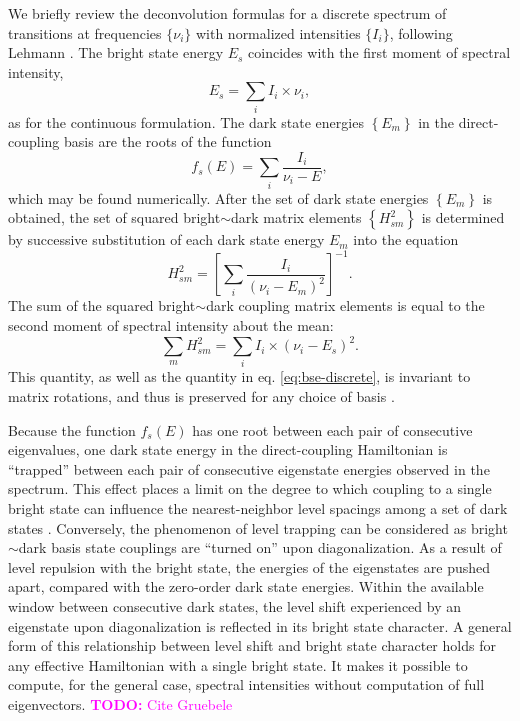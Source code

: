 \documentclass[12pt]{mitthesis}
\newcommand{\TODO} [1]{\textcolor{magenta}{\textbf{TODO:} #1}}
\begin{document}
We briefly review the deconvolution formulas for a discrete spectrum
of transitions at frequencies $\lbrace \nu_i \rbrace$ with normalized
intensities $\lbrace I_i \rbrace$, following Lehmann \cite{lehmann91}.
The bright state energy $E_s$ coincides with the first moment of
spectral intensity,
\begin{equation}
  \label{eq:bse-discrete}
  E_s = \sum_i I_i \times \nu_i,
\end{equation}
as for the continuous formulation.  The dark state energies $\left
  \lbrace E_m \right \rbrace$ in the direct-coupling basis are the
roots of the function
\begin{equation}
  f_s(E) = \sum_i \frac{I_i}{\nu_i - E},
\end{equation}
which may be found numerically.  After the set of dark state energies
$\left \lbrace E_m \right \rbrace$ is obtained, the set of squared
bright$\sim$dark matrix elements $\left \lbrace H_{sm}^2 \right
\rbrace$ is determined by successive substitution of each dark state
energy $E_m$ into the equation
\begin{equation}
  H_{sm}^2 = 
  \left [
    \sum_i \frac{I_i}{(\nu_i - E_m)^2}
  \right ]^{-1}.
\end{equation}
The sum of the squared bright$\sim$dark coupling matrix elements is
equal to the second moment of spectral intensity about the mean:
\begin{equation}
  \label{eq:me-sum-discrete}
  \sum_m H_{sm}^2 = \sum_i I_i \times (\nu_i - E_s)^2.
\end{equation}
This quantity, as well as the quantity in eq. \ref{eq:bse-discrete},
is invariant to matrix rotations, and thus is preserved for any choice
of basis \cite{lehmann91}.

Because the function $f_s(E)$ has one root between each pair of
consecutive eigenvalues, one dark state energy in the direct-coupling
Hamiltonian is ``trapped'' between each pair of consecutive eigenstate
energies observed in the spectrum.  This effect places a limit on the
degree to which coupling to a single bright state can influence the
nearest-neighbor level spacings among a set of dark states
\cite{coy87}.  Conversely, the phenomenon of level trapping can be
considered as bright$\sim$dark basis state couplings are ``turned on''
upon diagonalization.  As a result of level repulsion with the bright
state, the energies of the eigenstates are pushed apart, compared with
the zero-order dark state energies.  Within the available window
between consecutive dark states, the level shift experienced by an
eigenstate upon diagonalization is reflected in its bright state
character.  A general form of this relationship between level shift
and bright state character holds for any effective Hamiltonian with a
single bright state.  It makes it possible to compute, for the general
case, spectral intensities without computation of full eigenvectors.
\TODO{Cite Gruebele}
\end{document}
